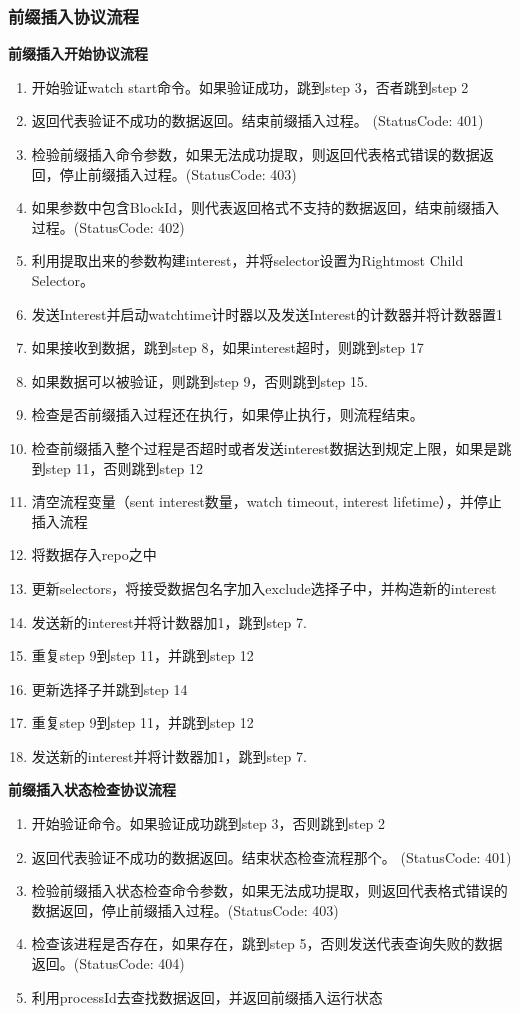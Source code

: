 \subsubsection{前缀插入协议流程}
\textbf{前缀插入开始协议流程}

\begin{enumerate}[step 1.]
\item 开始验证watch start命令。如果验证成功，跳到step 3，否者跳到step 2
\item 返回代表验证不成功的数据返回。结束前缀插入过程。 (StatusCode: 401)
\item 检验前缀插入命令参数，如果无法成功提取，则返回代表格式错误的数据返回，停止前缀插入过程。(StatusCode: 403)
\item 如果参数中包含BlockId，则代表返回格式不支持的数据返回，结束前缀插入过程。(StatusCode: 402) 
\item 利用提取出来的参数构建interest，并将selector设置为Rightmost Child Selector。
\item 发送Interest并启动watchtime计时器以及发送Interest的计数器并将计数器置1
\item 如果接收到数据，跳到step 8，如果interest超时，则跳到step 17
\item 如果数据可以被验证，则跳到step 9，否则跳到step 15.
\item 检查是否前缀插入过程还在执行，如果停止执行，则流程结束。
\item 检查前缀插入整个过程是否超时或者发送interest数据达到规定上限，如果是跳到step 11，否则跳到step 12
\item 清空流程变量（sent interest数量，watch timeout, interest lifetime），并停止插入流程
\item 将数据存入repo之中
\item 更新selectors，将接受数据包名字加入exclude选择子中，并构造新的interest
\item 发送新的interest并将计数器加1，跳到step 7.
\item 重复step 9到step 11，并跳到step 12
\item 更新选择子并跳到step 14
\item 重复step 9到step 11，并跳到step 12
\item 发送新的interest并将计数器加1，跳到step 7.
\end{enumerate}

\textbf{前缀插入状态检查协议流程}

\begin{enumerate}[step 1.]
\item 开始验证命令。如果验证成功跳到step 3，否则跳到step 2
\item 返回代表验证不成功的数据返回。结束状态检查流程那个。 (StatusCode: 401)
\item 检验前缀插入状态检查命令参数，如果无法成功提取，则返回代表格式错误的数据返回，停止前缀插入过程。(StatusCode: 403)
\item 检查该进程是否存在，如果存在，跳到step 5，否则发送代表查询失败的数据返回。(StatusCode: 404)
\item 利用processId去查找数据返回，并返回前缀插入运行状态
\end{enumerate}

